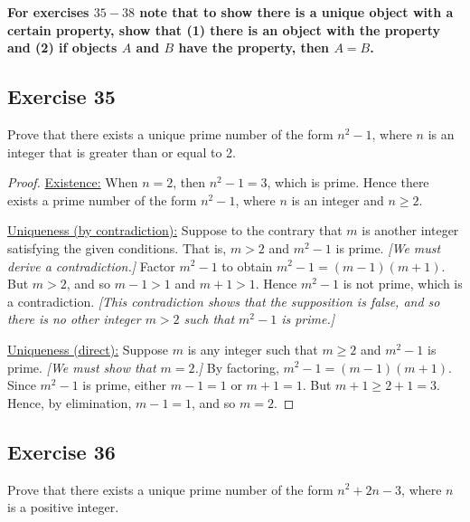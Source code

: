 \documentclass[14pt]{extarticle}
\newcommand{\cy}{\color{cyan}}
\begin{document}
{\bf \cy For exercises $35-38$ note that to show there is a unique object with a certain property, show that (1) there is an object with the property and (2) if objects $A$ and $B$ have the property, then $A = B$.}

\subsection{Exercise 35}
Prove that there exists a unique prime number of the form $n^2 - 1$, where $n$ is an integer that is greater than or equal to 2.

\begin{proof}
\underline{Existence:} When $n = 2$, then $n^2 - 1 = 3$, which is prime. Hence there exists a prime number of the form $n^2 - 1$, where $n$ is an integer and $n \geq 2$.

\underline{Uniqueness (by contradiction):} Suppose to the
contrary that $m$ is another integer satisfying the given
conditions. That is, $m > 2$ and $m^2 - 1$ is prime. {\it [We must derive a contradiction.]} Factor $m^2 - 1$ to obtain $m^2 - 1 = (m - 1)(m + 1)$. But $m > 2$, and so $m - 1 > 1$ and $m + 1 > 1$. Hence $m^2 - 1$ is not prime, which is a contradiction. {\it [This contradiction shows that the supposition is false, and so there is no other integer $m > 2$ such that $m^2 - 1$ is prime.]}

\underline{Uniqueness (direct):} Suppose $m$ is any integer
such that $m \geq 2$ and $m^2 - 1$ is prime. {\it [We must show that $m = 2$.]} By factoring, $m^2 - 1 = (m - 1)(m + 1)$. Since $m^2 - 1$ is prime, either $m - 1 = 1$ or $m + 1 = 1$. But $m + 1 \geq 2 + 1 = 3$. Hence, by elimination, $m - 1 = 1$, and so $m = 2$.
\end{proof}

\subsection{Exercise 36}
Prove that there exists a unique prime number of the form $n^2 + 2n - 3$, where $n$ is a positive integer.
\end{document}

